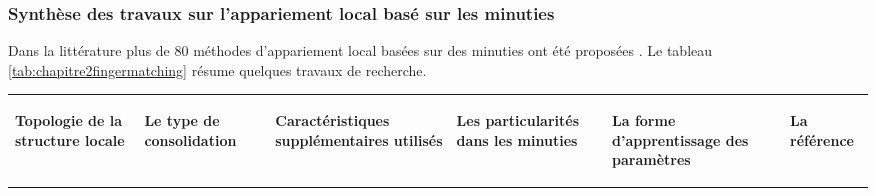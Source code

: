\subsubsection{Synthèse des travaux sur l'appariement local basé sur les minuties}
Dans la littérature plus de 80 méthodes d'appariement local basées sur des minuties ont été proposées \citep{Peralta2015a}.
Le tableau \ref{tab:chapitre2fingermatching} résume quelques travaux de recherche.

\begin{sidewaystable}[h!]
	\centering

	\begin{tabular}{|p{4cm}|p{4cm}|p{4cm}|p{3cm}|p{3cm}|p{4cm}|}
		\hline
		\begin{center}
			\textbf{Topologie de la structure locale}
		\end{center} &\begin{center}
			\textbf{Le type de consolidation}
		\end{center} &\begin{center}
			\textbf{Caractéristiques supplémentaires utilisés}
		\end{center} & \begin{center}
			\textbf{Les particularités dans les minuties} 
		\end{center}& \begin{center}
			\textbf{La forme d'apprentissage des paramètres}
		\end{center} &\begin{center}
			\textbf{La référence}\begin{center}
				

\end{center}
\end{center}
\end{tabular}
\end{sidewaystable}
